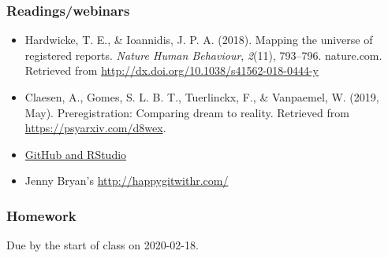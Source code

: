 \documentclass[
]{article}
\providecommand{\tightlist}{%
  \setlength{\itemsep}{0pt}\setlength{\parskip}{0pt}}
\begin{document}
\hypertarget{readingswebinars-3}{%
\subsubsection{Readings/webinars}\label{readingswebinars-3}}

\begin{itemize}
\tightlist
\item
  Hardwicke, T. E., \& Ioannidis, J. P. A. (2018). Mapping the universe
  of registered reports. \emph{Nature Human Behaviour}, \emph{2}(11),
  793--796. nature.com. Retrieved from
  \url{http://dx.doi.org/10.1038/s41562-018-0444-y}
\item
  Claesen, A., Gomes, S. L. B. T., Tuerlinckx, F., \& Vanpaemel, W.
  (2019, May). Preregistration: Comparing dream to reality. Retrieved
  from \url{https://psyarxiv.com/d8wex}.
\item
  \href{https://www.rstudio.com/resources/webinars/rstudio-essentials-webinar-series-managing-part-2/}{GitHub
  and RStudio}
\item
  Jenny Bryan's \url{http://happygitwithr.com/}
\end{itemize}

\hypertarget{homework-4}{%
\subsubsection{Homework}\label{homework-4}}

Due by the start of class on 2020-02-18.
\end{document}
